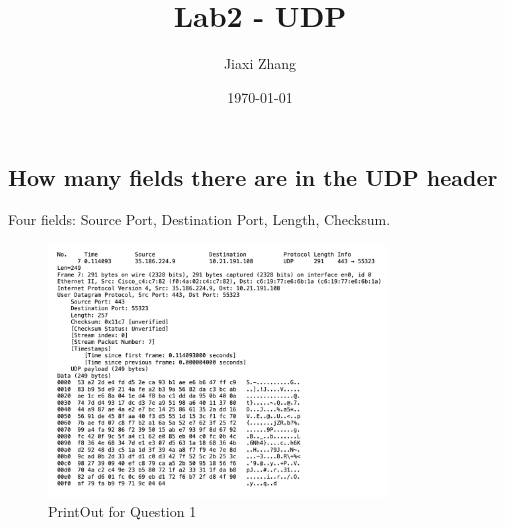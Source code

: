 \documentclass{article}
\title{Lab2 - UDP}
\author{Jiaxi Zhang}
\date{\today}
\begin{document}
\maketitle
\begin{CJK*}{UTF8}{gbsn}

\section{How many fields there are in the UDP header}
Four fields: Source Port, Destination Port, Length, Checksum.
\begin{figure}[H]
    \centering
    \includegraphics[width=0.8\textwidth]{Q1 - PrintOut.png}
    \caption{PrintOut for Question 1}
\end{figure}


\end{CJK*}
\end{document}
